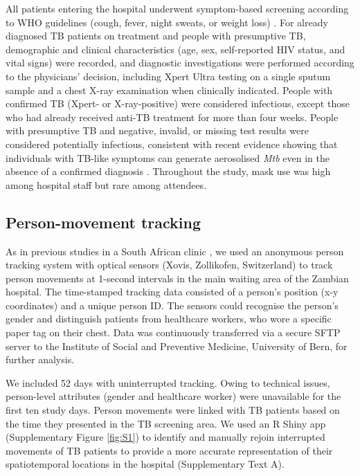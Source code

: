 \documentclass[11pt]{article}
\begin{document}
All patients entering the hospital underwent symptom-based screening according to WHO guidelines (cough, fever, night sweats, or weight loss) \cite{worldhealthorganization2014}. For already diagnosed TB patients on treatment and people with presumptive TB, demographic and clinical characteristics (age, sex, self-reported HIV status, and vital signs) were recorded, and diagnostic investigations were performed according to the physicians' decision, including Xpert Ultra testing on a single sputum sample and a chest X-ray examination when clinically indicated. People with confirmed TB (Xpert- or X-ray-positive) were considered infectious, except those who had already received anti-TB treatment for more than four weeks. People with presumptive TB and negative, invalid, or missing test results were considered potentially infectious, consistent with recent evidence showing that individuals with TB-like symptoms can generate aerosolised \emph{Mtb} even in the absence of a confirmed diagnosis \cite{dinkele2024iScience,patterson2024ProcNatlAcadSci}. Throughout the study, mask use was high among hospital staff but rare among attendees.

\subsection{Person-movement tracking}\label{person-movement-tracking}

As in previous studies in a South African clinic \cite{banholzer2025PLOSComputBiol,zurcher2022JInfectDis}, we used an anonymous person tracking system with optical sensors (Xovis, Zollikofen, Switzerland) to track person movements at 1-second intervals in the main waiting area of the Zambian hospital. The time-stamped tracking data consisted of a person's position (x-y coordinates) and a unique person ID. The sensors could recognise the person's gender and distinguish patients from healthcare workers, who wore a specific paper tag on their chest. Data was continuously transferred via a secure SFTP server to the Institute of Social and Preventive Medicine, University of Bern, for further analysis.

We included 52 days with uninterrupted tracking. Owing to technical issues, person-level attributes (gender and healthcare worker) were unavailable for the first ten study days. Person movements were linked with TB patients based on the time they presented in the TB screening area. We used an R Shiny app (Supplementary Figure \ref{fig:S1}) to identify and manually rejoin interrupted movements of TB patients to provide a more accurate representation of their spatiotemporal locations in the hospital (Supplementary Text A).
\end{document}
